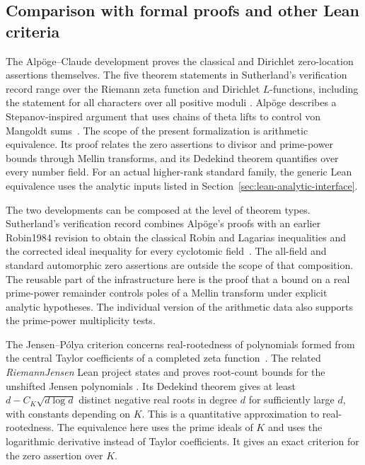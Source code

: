 \documentclass[11pt]{amsart}
\theoremstyle{definition}
\theoremstyle{remark}
\numberwithin{equation}{section}
\begin{document}
\subsection{Comparison with formal proofs and other Lean criteria}
\label{sec:prior-lean}

The Alp\"oge--Claude development proves the classical and Dirichlet
zero-location assertions themselves. The five theorem statements in
Sutherland's verification record range over the Riemann zeta
function and Dirichlet \(L\)-functions, including the statement for
all characters over all positive moduli
\cite{Alpoge2026,Sutherland2026}. Alp\"oge describes a
Stepanov-inspired argument that uses chains of theta lifts to
control von Mangoldt sums~\cite{Alpoge2026}. The scope of the
present formalization is arithmetic equivalence. Its proof relates
the zero assertions to divisor and prime-power bounds through
Mellin transforms, and its Dedekind theorem quantifies over every
number field. For an actual higher-rank standard family, the
generic Lean equivalence uses the analytic inputs listed in
Section~\ref{sec:lean-analytic-interface}.

The two developments can be composed at the level of theorem types.
Sutherland's verification record combines Alp\"oge's proofs with an
earlier Robin1984 revision to obtain the classical Robin and
Lagarias inequalities and the corrected ideal inequality for
every cyclotomic field~\cite{Sutherland2026}. The all-field and
standard automorphic zero assertions are outside the scope of that
composition. The reusable part of the infrastructure here is the
proof that a bound on a real prime-power remainder controls poles
of a Mellin transform under explicit analytic hypotheses. The
individual version of the arithmetic data also supports the
prime-power multiplicity tests.

The Jensen--P\'olya criterion concerns real-rootedness of
polynomials formed from the central Taylor coefficients of a
completed zeta function~\cite{OnoJensenPolya2026}.
The related \emph{RiemannJensen} Lean project states and proves
root-count bounds for the unshifted Jensen polynomials
\cite{AxiomRiemannJensen}. Its Dedekind theorem gives at least
\(d-C_K\sqrt{d\log d}\) distinct negative real roots in degree
\(d\) for sufficiently large \(d\), with constants depending on
\(K\). This is a quantitative approximation to real-rootedness.
The equivalence here uses the prime ideals of \(K\) and uses
the logarithmic derivative instead of Taylor coefficients.
It gives an exact criterion for the zero assertion over \(K\).
\end{document}
